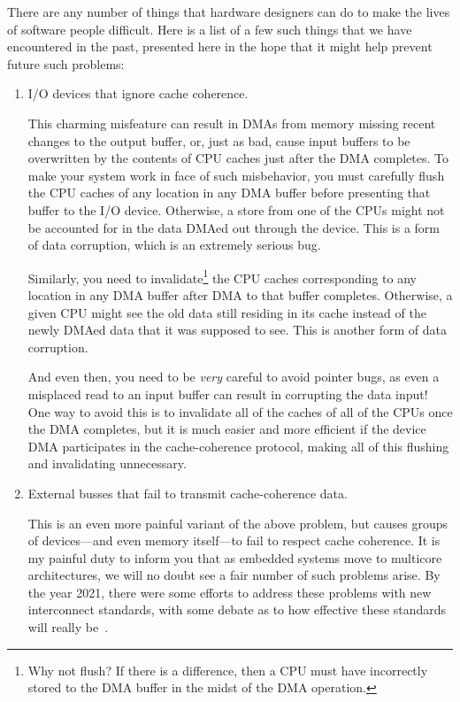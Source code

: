 There are any number of things that hardware designers can do
to make the lives of software people difficult.
Here is a list of a few such things that we have encountered in
the past, presented here in the hope that it might help prevent
future such problems:
\begin{enumerate}
\item	I/O devices that ignore cache coherence.

	This charming misfeature can result in DMAs from memory
	missing recent changes to the output buffer, or, just as
	bad, cause input buffers to be overwritten by the contents
	of CPU caches just after the DMA completes.
	To make your system work in face of such misbehavior,
	you must carefully flush the CPU caches of any location
	in any DMA buffer before presenting that buffer to the
	I/O device.
	Otherwise, a store from one of the CPUs might not be
	accounted for in the data DMAed out through the device.
	This is a form of data corruption, which is an extremely
	serious bug.

	Similarly, you need to invalidate\footnote{
		Why not flush?
		If there is a difference, then a CPU must have incorrectly
		stored to the DMA buffer in the midst of the DMA operation.}
	the CPU caches corresponding to any location in any DMA buffer
	after DMA to that buffer completes.
	Otherwise, a given CPU might see the old data still residing in
	its cache instead of the newly DMAed data that it was supposed
	to see.
	This is another form of data corruption.

	And even then, you need to be \emph{very} careful to avoid
	pointer bugs, as even a misplaced read to an input buffer
	can result in corrupting the data input!
	One way to avoid this is to invalidate all of the caches of
	all of the CPUs once the DMA completes, but it is much easier
	and more efficient if the device DMA participates in the
	cache-coherence protocol, making all of this flushing and
	invalidating unnecessary.

\item	External busses that fail to transmit cache-coherence data.

	This is an even more painful variant of the above problem,
	but causes groups of devices---and even memory itself---to
	fail to respect cache coherence.
	It is my painful duty to inform you that as embedded systems
	move to multicore architectures, we will no doubt see a fair
	number of such problems arise.
	By the year 2021, there were some efforts to address
	these problems with new interconnect standards, with some
	debate as to how effective these standards will really
	be~\cite{WilliamGWong2019CCIX-CXL}.


\end{enumerate}
